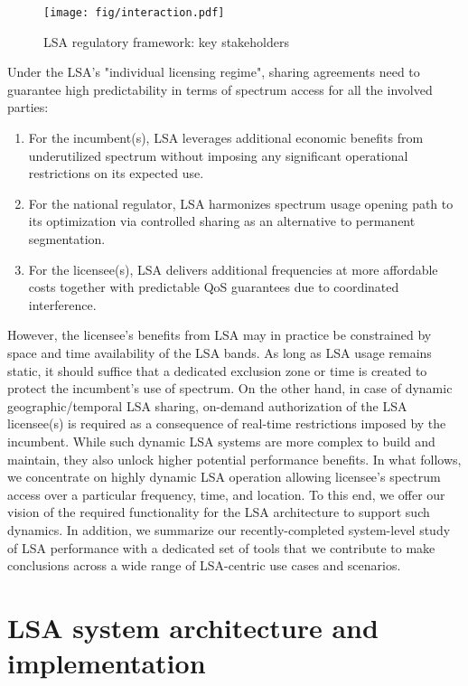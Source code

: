 \documentclass[journal]{IEEEtran}
\begin{document}
\begin{figure}[!ht]
\centering
\texttt{[image: fig/interaction.pdf]}
\caption{LSA regulatory framework: key stakeholders}
\label{fig:interactions}
\end{figure}

Under the LSA's "individual licensing regime", sharing agreements need to guarantee high predictability in terms of spectrum access for all the involved parties:

\begin{enumerate}
	\item For the incumbent(s), LSA leverages additional economic benefits from underutilized spectrum without imposing any significant operational restrictions on its expected use. 
	\item For the national regulator, LSA harmonizes spectrum usage opening path to its optimization via controlled sharing as an alternative to permanent segmentation.
	\item For the licensee(s), LSA delivers additional frequencies at more affordable costs together with predictable QoS guarantees due to coordinated interference.
\end{enumerate}

However, the licensee's benefits from LSA may in practice be constrained by space and time availability of the LSA bands. As long as LSA usage remains static, it should suffice that a dedicated exclusion zone or time is created to protect the incumbent's use of spectrum. On the other hand, in case of dynamic geographic/temporal LSA sharing, on-demand authorization of the LSA licensee(s) is required as a consequence of real-time restrictions imposed by the incumbent. While such dynamic LSA systems are more complex to build and maintain, they also unlock higher potential performance benefits. In what follows, we concentrate on highly dynamic LSA operation allowing licensee's spectrum access over a particular frequency, time, and location. To this end, we offer our vision of the required functionality for the LSA architecture to support such dynamics. In addition, we summarize our recently-completed system-level study of LSA performance with a dedicated set of tools that we contribute to make conclusions across a wide range of LSA-centric use cases and scenarios.



\section{LSA system architecture and implementation}
\end{document}
